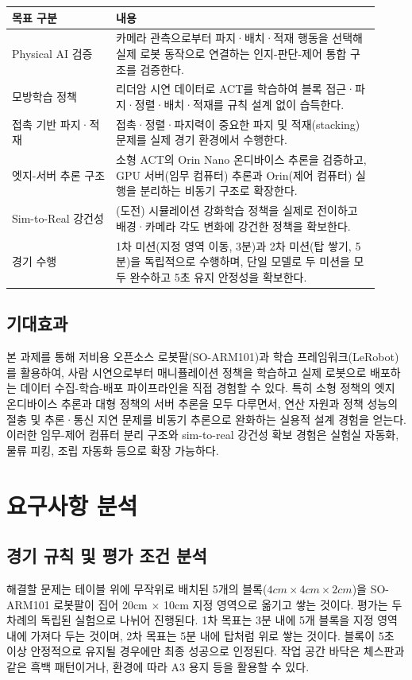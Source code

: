 \documentclass[titlepage]{pnureport}
\begin{document}
\begin{longtable}{p{0.26\linewidth}p{0.66\linewidth}}
\toprule
목표 구분 & 내용 \\
\midrule
\endhead
Physical AI 검증 & 카메라 관측으로부터 파지·배치·적재 행동을 선택해 실제 로봇 동작으로 연결하는 인지-판단-제어 통합 구조를 검증한다. \\
모방학습 정책 & 리더암 시연 데이터로 ACT를 학습하여 블록 접근·파지·정렬·배치·적재를 규칙 설계 없이 습득한다. \\
접촉 기반 파지·적재 & 접촉·정렬·파지력이 중요한 파지 및 적재(stacking) 문제를 실제 경기 환경에서 수행한다. \\
엣지-서버 추론 구조 & 소형 ACT의 Orin Nano 온디바이스 추론을 검증하고, GPU 서버(임무 컴퓨터) 추론과 Orin(제어 컴퓨터) 실행을 분리하는 비동기 구조로 확장한다. \\
Sim-to-Real 강건성 & (도전) 시뮬레이션 강화학습 정책을 실제로 전이하고 배경·카메라 각도 변화에 강건한 정책을 확보한다. \\
경기 수행 & 1차 미션(지정 영역 이동, 3분)과 2차 미션(탑 쌓기, 5분)을 독립적으로 수행하며, 단일 모델로 두 미션을 모두 완수하고 5초 유지 안정성을 확보한다. \\
\bottomrule
\end{longtable}

\section{기대효과}

본 과제를 통해 저비용 오픈소스 로봇팔(SO-ARM101)과 학습 프레임워크(LeRobot)를 활용하여, 사람 시연으로부터 매니퓰레이션 정책을 학습하고 실제 로봇으로 배포하는 데이터 수집-학습-배포 파이프라인을 직접 경험할 수 있다. 특히 소형 정책의 엣지 온디바이스 추론과 대형 정책의 서버 추론을 모두 다루면서, 연산 자원과 정책 성능의 절충 및 추론·통신 지연 문제를 비동기 추론으로 완화하는 실용적 설계 경험을 얻는다. 이러한 임무-제어 컴퓨터 분리 구조와 sim-to-real 강건성 확보 경험은 실험실 자동화, 물류 피킹, 조립 자동화 등으로 확장 가능하다.

\chapter{요구사항 분석}

\section{경기 규칙 및 평가 조건 분석}

해결할 문제는 테이블 위에 무작위로 배치된 5개의 블록($4cm \times 4cm \times 2cm$)을 SO-ARM101 로봇팔이 집어 20cm $\times$ 10cm 지정 영역으로 옮기고 쌓는 것이다. 평가는 두 차례의 독립된 실험으로 나뉘어 진행된다. 1차 목표는 3분 내에 5개 블록을 지정 영역 내에 가져다 두는 것이며, 2차 목표는 5분 내에 탑처럼 위로 쌓는 것이다. 블록이 5초 이상 안정적으로 유지될 경우에만 최종 성공으로 인정된다. 작업 공간 바닥은 체스판과 같은 흑백 패턴이거나, 환경에 따라 A3 용지 등을 활용할 수 있다.
\end{document}
